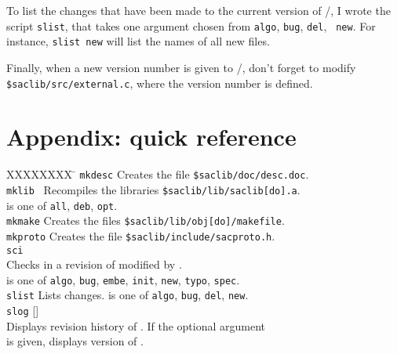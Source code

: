 To list the changes that have been made to the current version
of \SACLIB/, I wrote the script {\tt slist}, that takes one
argument chosen from {\tt algo}, {\tt bug}, {\tt del}, {\tt
new}.
For instance, {\tt slist new} will list the names of all new
files.

Finally, when a new version number is given to \SACLIB/, don't
forget to modify \verb|$saclib/src/external.c|, where the
version number is defined.


\section*{Appendix: quick reference}

\medskip

\begin{tabbing}
XXXXXXXX \= \kill
{\tt mkdesc} \> Creates the file \verb|$saclib/doc/desc.doc|. \\[1em]
{\tt mklib } \> Recompiles the libraries
         \verb|$saclib/lib/saclib[do].a|. \\
	 \>  is one of {\tt all}, {\tt deb}, {\tt opt}. \\[1em]
{\tt mkmake} \> Creates the files \verb|$saclib/lib/obj[do]/makefile|. \\[1em]
{\tt mkproto} \> Creates the file \verb|$saclib/include/sacproto.h|.\\[1em]
{\tt sci}   \\
 \> Checks in a revision of  modified by .\\
 \>  is one of {\tt algo}, {\tt bug}, {\tt embe},
                {\tt init}, {\tt new}, {\tt typo}, {\tt spec}. \\[1em]
{\tt slist}  
\> Lists changes.   is one of {\tt algo}, {\tt bug},
{\tt del}, {\tt new}. \\[1em]
{\tt slog}  []\\
 \> Displays revision history of .  If the
optional argument \\
 \> is given, displays version  of .
\end{tabbing}




